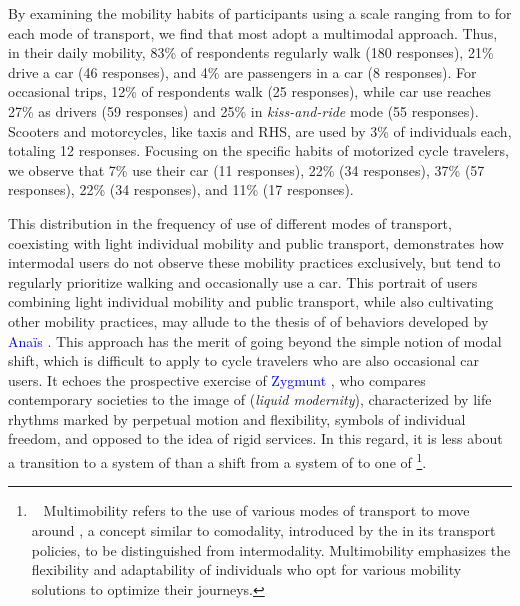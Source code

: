 \begin{refsegment}
By examining the mobility habits of participants using a scale ranging from  to  for each mode of transport, we find that most adopt a multimodal approach. Thus, in their daily mobility, 83\% of respondents regularly walk (180 responses), 21\% drive a car (46 responses), and 4\% are passengers in a car (8 responses). For occasional trips, 12\% of respondents walk (25 responses), while car use reaches 27\% as drivers (59 responses) and 25\% in \textsl{kiss-and-ride} mode (55 responses). Scooters and motorcycles, like taxis and \acrshort{RHS}, are used by 3\% of individuals each, totaling 12 responses. Focusing on the specific habits of motorized cycle travelers, we observe that 7\% use their car  (11 responses), 22\%  (34 responses), 37\%  (57 responses), 22\%  (34 responses), and 11\%  (17 responses).%

This distribution in the frequency of use of different modes of transport, coexisting with light individual mobility and public transport, demonstrates how intermodal users do not observe these mobility practices exclusively, but tend to regularly prioritize walking and occasionally use a car. This portrait of users combining light individual mobility and public transport, while also cultivating other mobility practices, may allude to the thesis of  of behaviors developed by \textcolor{blue}{Anaïs} \textcolor{blue}{\textcite[16]{rocci_automobilite_2007}}. This approach has the merit of going beyond the simple notion of modal shift, which is difficult to apply to cycle travelers who are also occasional car users. It echoes the prospective exercise of \textcolor{blue}{Zygmunt} \textcolor{blue}{\textcite[7-28]{bauman_liquid_2000}}, who compares contemporary societies to the image of  (\textsl{liquid modernity}), characterized by life rhythms marked by perpetual motion and flexibility, symbols of individual freedom, and opposed to the idea of rigid services. In this regard, it is less about a transition to a system of  \textcolor{blue}{\autocite[492]{watson_how_2012}} than a shift from a system of  \textcolor{blue}{\autocites[57-58]{urry_sociology_2000}[28]{urry_system_2004}} to one of \footnote{~
    Multimobility refers to the use of various modes of transport to move around \textcolor{blue}{\autocite[10]{rocci_automobilite_2007}}, a concept similar to comodality, introduced by the \textcolor{blue}{\textcite[6]{parlement_europeen_pour_2007}} in its transport policies, to be distinguished from intermodality. Multimobility emphasizes the flexibility and adaptability of individuals who opt for various mobility solutions to optimize their journeys.
}.%


\end{refsegment}
